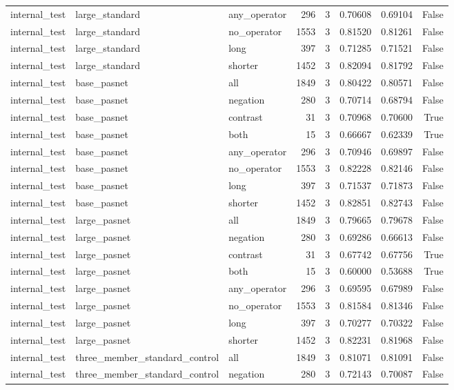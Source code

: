 \begin{tabular}{lllrrrrr}
internal\_test & large\_standard & any\_operator & 296 & 3 & 0.70608 & 0.69104 & False \\
internal\_test & large\_standard & no\_operator & 1553 & 3 & 0.81520 & 0.81261 & False \\
internal\_test & large\_standard & long & 397 & 3 & 0.71285 & 0.71521 & False \\
internal\_test & large\_standard & shorter & 1452 & 3 & 0.82094 & 0.81792 & False \\
internal\_test & base\_pasnet & all & 1849 & 3 & 0.80422 & 0.80571 & False \\
internal\_test & base\_pasnet & negation & 280 & 3 & 0.70714 & 0.68794 & False \\
internal\_test & base\_pasnet & contrast & 31 & 3 & 0.70968 & 0.70600 & True \\
internal\_test & base\_pasnet & both & 15 & 3 & 0.66667 & 0.62339 & True \\
internal\_test & base\_pasnet & any\_operator & 296 & 3 & 0.70946 & 0.69897 & False \\
internal\_test & base\_pasnet & no\_operator & 1553 & 3 & 0.82228 & 0.82146 & False \\
internal\_test & base\_pasnet & long & 397 & 3 & 0.71537 & 0.71873 & False \\
internal\_test & base\_pasnet & shorter & 1452 & 3 & 0.82851 & 0.82743 & False \\
internal\_test & large\_pasnet & all & 1849 & 3 & 0.79665 & 0.79678 & False \\
internal\_test & large\_pasnet & negation & 280 & 3 & 0.69286 & 0.66613 & False \\
internal\_test & large\_pasnet & contrast & 31 & 3 & 0.67742 & 0.67756 & True \\
internal\_test & large\_pasnet & both & 15 & 3 & 0.60000 & 0.53688 & True \\
internal\_test & large\_pasnet & any\_operator & 296 & 3 & 0.69595 & 0.67989 & False \\
internal\_test & large\_pasnet & no\_operator & 1553 & 3 & 0.81584 & 0.81346 & False \\
internal\_test & large\_pasnet & long & 397 & 3 & 0.70277 & 0.70322 & False \\
internal\_test & large\_pasnet & shorter & 1452 & 3 & 0.82231 & 0.81968 & False \\
internal\_test & three\_member\_standard\_control & all & 1849 & 3 & 0.81071 & 0.81091 & False \\
internal\_test & three\_member\_standard\_control & negation & 280 & 3 & 0.72143 & 0.70087 & False \\

\end{tabular}
